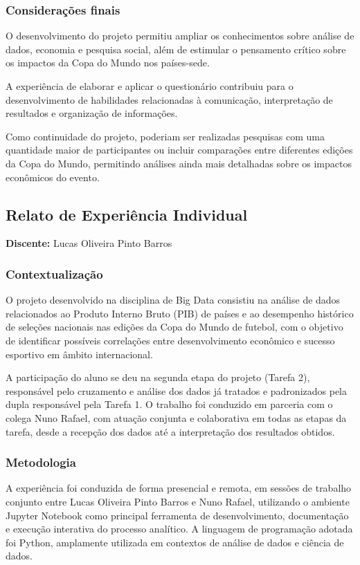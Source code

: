 \documentclass[12pt, a4paper, brazil]{article}
\begin{document}
\subsubsection{Considerações finais}
O desenvolvimento do projeto permitiu ampliar os conhecimentos sobre análise de dados, economia e pesquisa social, além de estimular o pensamento crítico sobre os impactos da Copa do Mundo nos países-sede. 

A experiência de elaborar e aplicar o questionário contribuiu para o desenvolvimento de habilidades relacionadas à comunicação, interpretação de resultados e organização de informações. 

Como continuidade do projeto, poderiam ser realizadas pesquisas com uma quantidade maior de participantes ou incluir comparações entre diferentes edições da Copa do Mundo, permitindo análises ainda mais detalhadas sobre os impactos econômicos do evento.

\subsection{Relato de Experiência Individual}
\textbf{Discente:} Lucas Oliveira Pinto Barros

\subsubsection{Contextualização}
O projeto desenvolvido na disciplina de Big Data consistiu na análise de dados relacionados ao Produto Interno Bruto (PIB) de países e ao desempenho histórico de seleções nacionais nas edições da Copa do Mundo de futebol, com o objetivo de identificar possíveis correlações entre desenvolvimento econômico e sucesso esportivo em âmbito internacional.

A participação do aluno se deu na segunda etapa do projeto (Tarefa 2), responsável pelo cruzamento e análise dos dados já tratados e padronizados pela dupla responsável pela Tarefa 1. O trabalho foi conduzido em parceria com o colega Nuno Rafael, com atuação conjunta e colaborativa em todas as etapas da tarefa, desde a recepção dos dados até a interpretação dos resultados obtidos.

\subsubsection{Metodologia}
A experiência foi conduzida de forma presencial e remota, em sessões de trabalho conjunto entre Lucas Oliveira Pinto Barros e Nuno Rafael, utilizando o ambiente Jupyter Notebook como principal ferramenta de desenvolvimento, documentação e execução interativa do processo analítico. A linguagem de programação adotada foi Python, amplamente utilizada em contextos de análise de dados e ciência de dados.
\end{document}

